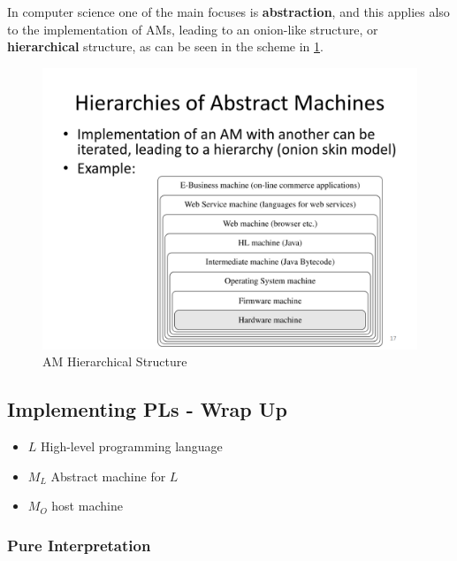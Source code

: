 In computer science one of the main focuses is \textbf{abstraction}, and this applies also to the implementation of AMs, leading to an onion-like structure, or \textbf{hierarchical} structure,
as can be seen in the scheme in \ref{fig:machines_hierarchy}.

\begin{figure}[htbp]
    \centering
    \includegraphics{images/machines_hierarchy.png}
    \caption{AM Hierarchical Structure}
    \label{fig:machines_hierarchy}
\end{figure}


\subsection*{Implementing PLs - Wrap Up}
\begin{itemize}
    \item $L$ High-level programming language
    \item $M_L$ Abstract machine for $L$
    \item $M_O$ host machine
\end{itemize}

\subsubsection{Pure Interpretation}

